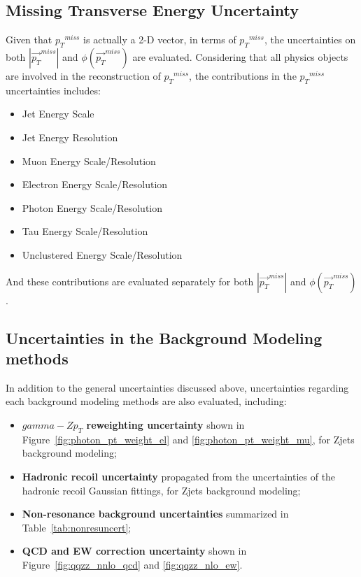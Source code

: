 \subsection{Missing Transverse Energy Uncertainty}
Given that ${p_{T}}^{miss}$ is actually a 2-D vector, in terms of ${p_{T}}^{miss}$, the uncertainties on both $|{\vec{p_{T}}^{miss}}|$ and $\phi({\vec{p_{T}}}^{miss})$ are evaluated. Considering that all physics objects are involved in the reconstruction of ${p_{T}}^{miss}$, the contributions in the ${p_{T}}^{miss}$ uncertainties includes:
\begin{itemize}
\item Jet Energy Scale
\item Jet Energy Resolution
\item Muon Energy Scale/Resolution
\item Electron Energy Scale/Resolution
\item Photon Energy Scale/Resolution
\item Tau Energy Scale/Resolution
\item Unclustered Energy Scale/Resolution
\end{itemize}

And these contributions are evaluated separately for both $|{\vec{p_{T}}^{miss}}|$ and $\phi({\vec{p_{T}}}^{miss})$.
\subsection{Uncertainties in the Background Modeling methods}
In addition to the general uncertainties discussed above, uncertainties regarding each background modeling methods are also evaluated, including:
\begin{itemize}
\item \textbf{$gamma-Z p_T$ reweighting uncertainty} shown in Figure~\ref{fig:photon_pt_weight_el} and \ref{fig:photon_pt_weight_mu}, for Zjets background modeling;
\item \textbf{Hadronic recoil uncertainty} propagated from the uncertainties of the hadronic recoil Gaussian fittings, for Zjets background modeling;
\item \textbf{Non-resonance background uncertainties} summarized in Table~\ref{tab:nonresuncert};
\item \textbf{QCD and EW correction uncertainty} shown in Figure~\ref{fig:qqzz_nnlo_qcd} and \ref{fig:qqzz_nlo_ew}.
\end{itemize}

